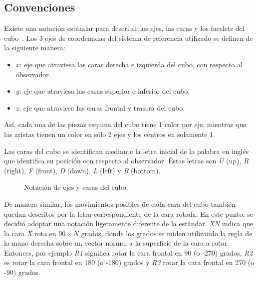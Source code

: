 \subsection{Convenciones}
Existe una notación estándar para describir los ejes, las caras y los facelets del cubo~\cite{notationsingmaster}.
Los 3 ejes de coordenadas del sistema de referencia utilizado se definen de la siguiente manera:
\begin{itemize}
	\item $x$: eje que atraviesa las caras derecha e izquierda del cubo, con respecto al observador.
	\item $y$: eje que atraviesa las caras superior e inferior del cubo.
	\item $z$: eje que atraviesa las caras frontal y trasera del cubo.
\end{itemize}
Así, cada una de las piezas esquina del cubo tiene 1 color por eje, mientras que las aristas tienen un color en sólo 2 ejes y los centros en solamente 1.

Las caras del cubo se identifican mediante la letra inicial de la palabra en inglés que identifica su posición con respecto al observador.
Éstas letras son \textit{U} (up), \textit{R} (right), \textit{F} (front), \textit{D} (down), \textit{L} (left) y \textit{B} (bottom).

\begin{figure}[h!]
	\centering
	\hfill
	\caption{Notación de ejes y caras del cubo.}
\end{figure}
De manera similar, los movimientos posibles de cada cara del cubo también quedan descritos por la letra correspondiente de la cara rotada.
En este punto, se decidió adoptar una notación ligeramente diferente de la estándar.
\textit{XN} indica que la cara \textit{X} rota en $90 \times N$ grados, donde los grados se miden utilizando la regla de la mano derecha sobre un vector normal a la superficie de la cara a rotar.
Entonces, por ejemplo \textit{R1} significa rotar la cara frontal en 90 (o -270) grados, \textit{R2} es rotar la cara frontal en 180 (o -180) grados y \textit{R3} rotar la cara frontal en 270 (o -90) grados.

